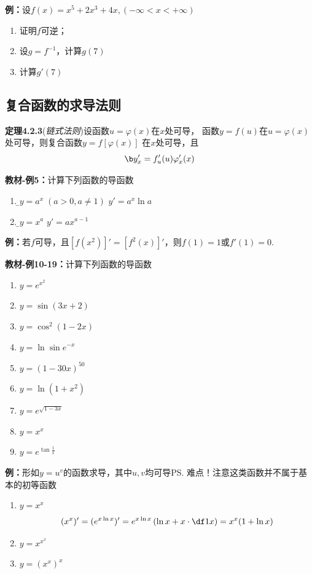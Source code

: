 {\bf 例：}设$f(x)=x^5+2x^3+4x,(-\infty<x<+\infty)$
\begin{enumerate}[(1)]
  \setlength{\itemindent}{1cm}
  \item 证明$f$可逆；
  \item 设$g=f^{-1}$，计算$g(7)$
  \item 计算$g'(7)$
\end{enumerate}

\subsection{复合函数的求导法则}

{\bf 定理4.2.3}({\it 链式法则})设函数$u=\varphi(x)$在$x$处可导，
函数$y=f(u)$在$u=\varphi(x)$处可导，则复合函数$y=f[\varphi(x)]$
在$x$处可导，且
$${\b y'_x=f_u'(u)\varphi_x'(x)}$$

{\bf 教材-例5：}计算下列函数的导函数
\begin{enumerate}[(1)]
  \setlength{\itemindent}{1cm}
  \item {\b$y=a^x\;(a>0,a\ne 1)$ \hfill $y'=a^x\ln a$} 
  \item {\b$y=x^a$ \hfill $y'=ax^{a-1}$}
\end{enumerate}

{\bf 例：}若$f$可导，且$[f(x^2)]'=[f^2(x)]'$，则$f(1)=1$或$f'(1)=0$.

{\bf 教材-例10-19：}计算下列函数的导函数
\begin{enumerate}[(1)]
  \setlength{\itemindent}{1cm}
  \item $y=e^{x^2}$ 
  \item $y=\sin (3x+2)$ 
  \item $y=\cos^2(1-2x)$ 
  \item $y=\ln\sin e^{-x}$ 
  \item $y=(1-30x)^{50}$ 
  \item $y=\ln(1+x^2)$ 
  \item $y=e^{\sqrt{1-3x}}$ 
  \item $y=x^x$ 
  \item $y=e^{\tan\frac 1x}$
\end{enumerate}

{\b{\bf 例：}形如$y=u^v$的函数求导，其中$u,v$均可导\ps{难点！注意这类函数并不属于基本的初等函数}
\begin{enumerate}[(1)]
  \setlength{\itemindent}{1cm}
  \item $y=x^x$
  $$(x^x)'=(e^{x\ln x})'=e^{x\ln x}\left(\ln x+x\cdot\df1x\right)=x^x(1+\ln x)$$
  \item $y=x^{x^x}$
  \item $y=\left(x^x\right)^x$
\end{enumerate}
}


